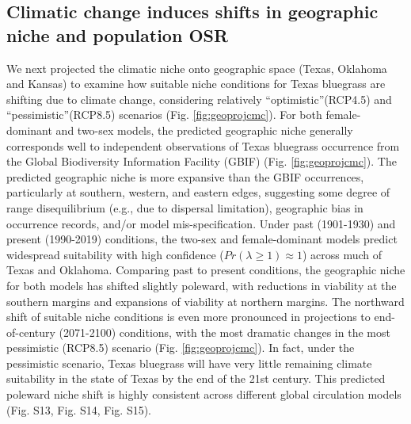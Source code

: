 \documentclass[9pt,twocolumn,twoside,lineno]{pnas-new}
\begin{document}
\subsection*{Climatic change induces shifts in geographic niche and population OSR}
We next projected the climatic niche onto geographic space (Texas, Oklahoma and Kansas) to examine how suitable niche conditions for Texas bluegrass are shifting due to climate change, considering relatively ``optimistic''(RCP4.5)  and ``pessimistic''(RCP8.5) scenarios (Fig. \ref{fig:geoprojcmc}). 
For both female-dominant and two-sex models, the predicted geographic niche generally corresponds well to independent observations of Texas bluegrass occurrence from the Global Biodiversity Information Facility (GBIF) (Fig. \ref{fig:geoprojcmc}).
The predicted geographic niche is more expansive than the GBIF occurrences, particularly at southern, western, and eastern edges, suggesting some degree of range disequilibrium (e.g., due to dispersal limitation), geographic bias in occurrence records, and/or model mis-specification. 
Under past (1901-1930) and present (1990-2019) conditions, the two-sex and female-dominant models predict widespread suitability with high confidence ($Pr(\lambda  \ge 1) \approx 1$) across much of Texas and Oklahoma. 
Comparing past to present conditions, the geographic niche for both models has shifted slightly poleward, with reductions in viability at the southern margins and expansions of viability at northern margins. 
The northward shift of suitable niche conditions is even more pronounced in projections to end-of-century (2071-2100) conditions, with the most dramatic changes in the most pessimistic (RCP8.5) scenario (Fig. \ref{fig:geoprojcmc}). 
In fact, under the pessimistic scenario, Texas bluegrass will have very little remaining climate suitability in the state of Texas by the end of the 21st century. 
This predicted poleward niche shift is highly consistent across different global circulation models (Fig. S13, Fig. S14, Fig. S15). 
\end{document}
